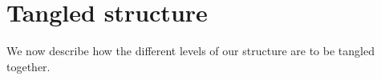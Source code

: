 \section{Tangled structure}

We now describe how the different levels of our structure are to be tangled together.







